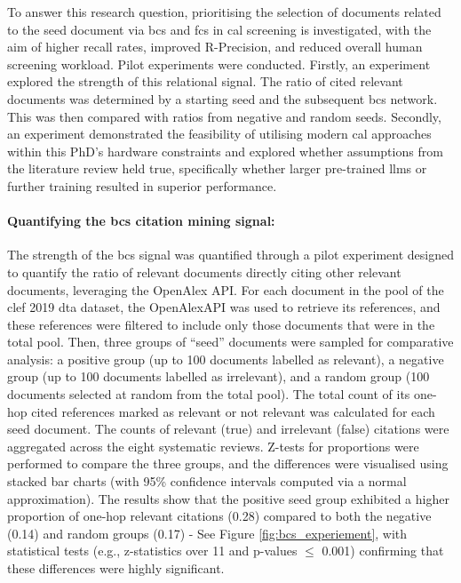 \documentclass[10pt,oneside]{book}
\begin{document}
To answer this research question, prioritising the selection of documents related to the seed document via \gls*{bcs} and \gls*{fcs} in \gls*{cal} screening is investigated, with the aim of higher recall rates, improved R-Precision, and reduced overall human screening workload. Pilot experiments were conducted. Firstly, an experiment explored the strength of this relational signal. The ratio of cited relevant documents was determined by a starting seed and the subsequent \gls*{bcs} network. This was then compared with ratios from negative and random seeds. Secondly, an experiment demonstrated the feasibility of utilising modern \gls*{cal} approaches within this PhD's hardware constraints and explored whether assumptions from the literature review held true, specifically whether larger pre-trained \glspl*{llm} or further training resulted in superior performance.


\paragraph{Quantifying the \gls*{bcs} citation mining signal:}
The strength of the \gls*{bcs} signal was quantified through a pilot experiment designed to quantify the ratio of relevant documents directly citing other relevant documents, leveraging the OpenAlex API. For each document in the pool of the \gls*{clef} 2019 \gls*{dta} dataset, the OpenAlexAPI was used to retrieve its references, and these references were filtered to include only those documents that were in the total pool. Then, three groups of ``seed” documents were sampled for comparative analysis: a positive group (up to 100 documents labelled as relevant), a negative group (up to 100 documents labelled as irrelevant), and a random group (100 documents selected at random from the total pool). The total count of its one-hop cited references marked as relevant or not relevant was calculated for each seed document. The counts of relevant (true) and irrelevant (false) citations were aggregated across the eight systematic reviews. Z-tests for proportions were performed to compare the three groups, and the differences were visualised using stacked bar charts (with 95\% confidence intervals computed via a normal approximation). The results show that the positive seed group exhibited a higher proportion of one-hop relevant citations (0.28) compared to both the negative (0.14) and random groups (0.17) - See Figure \ref{fig:bcs_experiement}, with statistical tests (e.g., z-statistics over 11 and p-values $\leq$ 0.001) confirming that these differences were highly significant.
\end{document}
